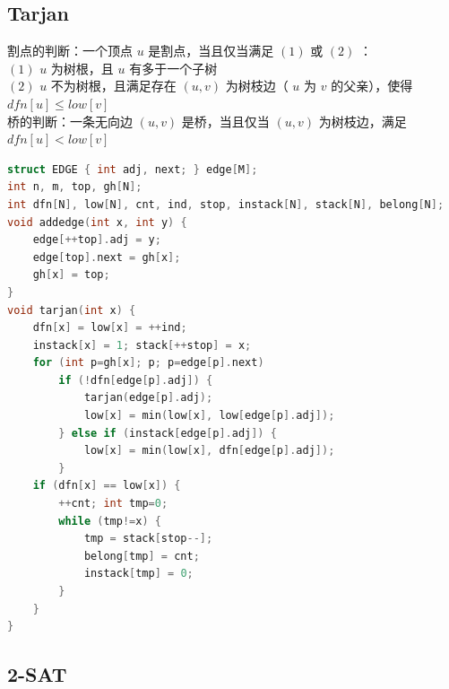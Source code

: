 \documentclass{article}
\begin{document}
\subsection{Tarjan}
割点的判断：一个顶点 $u$ 是割点，当且仅当满足 $(1)$ 或 $(2)$ ： \\
$(1)$ $u$ 为树根，且 $u$ 有多于一个子树 \\
$(2)$ $u$ 不为树根，且满足存在 $(u, v)$ 为树枝边（ $u$ 为 $v$ 的父亲），使得 $dfn[u] \leq low[v]$ \\
桥的判断：一条无向边 $(u, v)$ 是桥，当且仅当 $(u, v)$ 为树枝边，满足 $dfn[u] < low[v]$ 
\begin{lstlisting}[language=C++]
struct EDGE { int adj, next; } edge[M];
int n, m, top, gh[N];
int dfn[N], low[N], cnt, ind, stop, instack[N], stack[N], belong[N];
void addedge(int x, int y) {
	edge[++top].adj = y;
	edge[top].next = gh[x];
	gh[x] = top;
}
void tarjan(int x) {
	dfn[x] = low[x] = ++ind;
	instack[x] = 1; stack[++stop] = x;
	for (int p=gh[x]; p; p=edge[p].next)
		if (!dfn[edge[p].adj]) {
			tarjan(edge[p].adj);
			low[x] = min(low[x], low[edge[p].adj]);
		} else if (instack[edge[p].adj]) {
			low[x] = min(low[x], dfn[edge[p].adj]);
		}
	if (dfn[x] == low[x]) {
		++cnt; int tmp=0;
		while (tmp!=x) {
			tmp = stack[stop--];
			belong[tmp] = cnt;
			instack[tmp] = 0;
		}
	}
}
\end{lstlisting}
\subsection{2-SAT}
\end{document}
